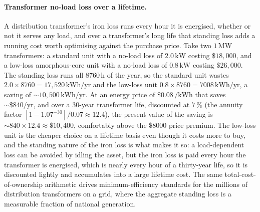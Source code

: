 \paragraph{Transformer no-load loss over a lifetime.} A distribution
transformer's iron loss runs every hour it is energised, whether or not it
serves any load, and over a transformer's long life that standing loss adds a
running cost worth optimising against the purchase price. Take two
$1\,\si{\mega\watt}$ transformers: a standard unit with a no-load loss of
$2.0\,\si{\kilo\watt}$ costing $\$18{,}000$, and a low-loss amorphous-core
unit with a no-load loss of $0.8\,\si{\kilo\watt}$ costing $\$26{,}000$. The
standing loss runs all $8760\,\si{\hour}$ of the year, so the standard unit
wastes $2.0\times 8760 = 17{,}520\,\si{\kilo\watt\hour}/\text{yr}$ and the
low-loss unit $0.8\times 8760 = 7008\,\si{\kilo\watt\hour}/\text{yr}$, a
saving of $\sim 10{,}500\,\si{\kilo\watt\hour}/\text{yr}$. At an energy price
of $\$0.08\,\si{\per\kilo\watt\hour}$ that saves $\sim \$840/\text{yr}$, and
over a $30$-year transformer life, discounted at $7\,\%$ (the annuity factor
$[1 - 1.07^{-30}]/0.07 \approx 12.4$), the present value of the saving is
$\sim 840\times 12.4 \approx \$10{,}400$, comfortably above the $\$8000$ price
premium. The low-loss unit is the cheaper choice on a lifetime basis even
though it costs more to buy, and the standing nature of the iron loss is what
makes it so: a load-dependent loss can be avoided by idling the asset, but the
iron loss is paid every hour the transformer is energised, which is nearly
every hour of a thirty-year life, so it is discounted lightly and accumulates
into a large lifetime cost. The same total-cost-of-ownership arithmetic drives
minimum-efficiency standards for the millions of distribution transformers on
a grid, where the aggregate standing loss is a measurable fraction of national
generation.

